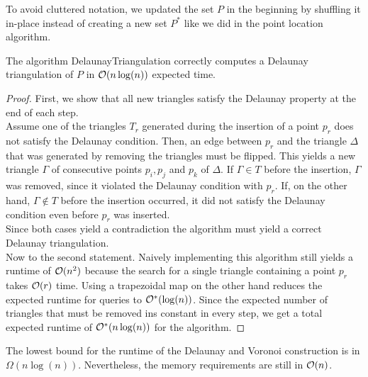         \begin{remark}
            To avoid cluttered notation, we updated the set $P$ in the beginning by shuffling it in-place instead of creating a new set $P^\ast$ like we did in the point location algorithm. 
        \end{remark}

        \begin{theorem}
            The algorithm DelaunayTriangulation correctly computes a Delaunay triangulation of $P$ in $\mathcal{O}(n\log(n))$ expected time.
        \end{theorem}
        \begin{proof}
            First, we show that all new triangles satisfy the Delaunay property at the end of each step. \\
            Assume one of the triangles $T_r$ generated during the insertion of a point $p_r$ does not satisfy the Delaunay condition. Then, an edge between $p_r$ and the triangle $\Delta$ that was generated by removing the triangles must be flipped. This yields a new triangle $\Gamma$ of consecutive points $p_i, p_j$ and $p_k$ of $\Delta$. If $\Gamma \in T$ before the insertion, $\Gamma$ was removed, since it violated the Delaunay condition with $p_r$. If, on the other hand, $\Gamma \notin T$ before the insertion occurred, it did not satisfy the Delaunay condition even before $p_r$ was inserted. \\
            Since both cases yield a contradiction the algorithm must yield a correct Delaunay triangulation. \\
            Now to the second statement. Naively implementing this algorithm still yields a runtime of $\mathcal{O}(n^2)$ because the search for a single triangle containing a point $p_r$ takes $\mathcal{O}(r)$ time. Using a trapezoidal map on the other hand reduces the expected runtime for queries to $\mathcal{O}^\ast(\log(n))$. Since the expected number of triangles that must be removed ins constant in every step, we get a total expected runtime of $\mathcal{O}^\ast(n\log(n))$ for the algorithm. 
        \end{proof}

        \begin{remark} 
            The lowest bound for the runtime of the Delaunay and Voronoi construction is in $\Omega(n\log(n))$. Nevertheless, the memory requirements are still in $\mathcal{O}(n)$.
        \end{remark}
